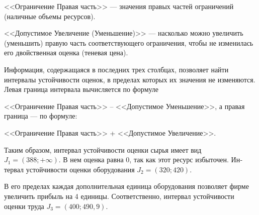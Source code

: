 <<Ограничение Правая часть>> --- значения правых частей ограничений (наличные объемы ресурсов).

<<Допустимое Увеличение (Уменьшение)>> --- насколько можно увеличить (уменьшить) правую часть соответствующего ограничения, чтобы не изменилась его двойственная оценка (теневая цена).

Информация, содержащаяся в последних трех столбцах, позволяет найти интервалы устойчивости оценок, в пределах которых их значения не изменяются. Левая граница интервала вычисляется по формуле

<<Ограничение Правая часть>> -- <<Допустимое Уменьшение>>, а правая граница --- по формуле:

<<Ограничение Правая часть>> + <<Допустимое Увеличение>>.

Таким образом, интервал устойчивости оценки сырья имеет вид $J_1 = (388; +\infty)$. В нем оценка равна 0, так как этот ресурс избыточен. Ин­тервал устойчивости оценки оборудования $J_2 = (320; 420)$.

В его пределах каждая дополнительная единица оборудования позволяет фирме увеличить прибыль на 4 единицы. Соответственно, интервал устойчиво­сти оценки труда $J_3 = (400; 490,9)$.